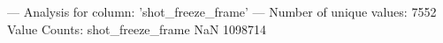 --- Analysis for column: 'shot_freeze_frame' ---
Number of unique values: 7552
Value Counts:
shot_freeze_frame
NaN                                                                                                                                                                                                                                                                                                                                                                                                                                                                                                                                                                                                                                                                                                                                                                                                                                                                                                                                                                                                                                                                                                                                                                                                                                                                                                                                                                                                                                                                                                                                                                                                                                                                                                                                                                                                                                                                                                                                                                                                                                                                                                                                                                                                                                                                                                                                                                                                                                                                                                                                                                                                                                                                                                                                                                                                                                                                                                                                                                                                                           1098714
